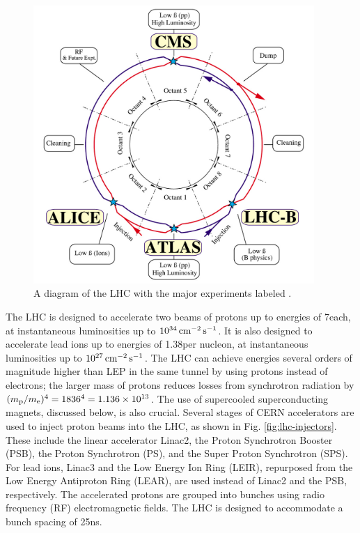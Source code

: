 \documentclass[12pt]{thesis}  %
\newcommand{\Pe}{\ensuremath{\cmsSymbolFace{e}}\xspace}
\newcommand{\Pp}{\ensuremath{\cmsSymbolFace{p}}\xspace}
\begin{document}
\begin{figure}[hbt]
\begin{center}
\includegraphics[width=0.95\textwidth]{figures/lhc-pho-1997-060.png}
\caption{A diagram of the LHC with the major experiments labeled \cite{Jean-Luc:841573}.}
\label{fig:lhc-diagram}
\end{center}
\end{figure}

The LHC is designed to accelerate two beams of protons up to energies of 7\TeV each, at instantaneous luminosities up to $10^{34}\,\text{cm}^\text{$-$2}\,\text{s}^\text{$-$1}$. It is also designed to accelerate lead ions up to energies of 1.38\TeV per nucleon, at instantaneous luminosities up to $10^{27}\,\text{cm}^\text{$-$2}\,\text{s}^\text{$-$1}$. The LHC can achieve energies several orders of magnitude higher than LEP in the same tunnel by using protons instead of electrons; the larger mass of protons reduces losses from synchrotron radiation by $(m_{\Pp}/m_{\Pe})^{4} = 1836^{4} = 1.136\times10^{13}$. The use of supercooled superconducting magnets, discussed below, is also crucial. Several stages of CERN accelerators are used to inject proton beams into the LHC, as shown in Fig. \ref{fig:lhc-injectors}. These include the linear accelerator Linac2, the Proton Synchrotron Booster (PSB), the Proton Synchrotron (PS), and the Super Proton Synchrotron (SPS). For lead ions, Linac3 and the Low Energy Ion Ring (LEIR), repurposed from the Low Energy Antiproton Ring (LEAR), are used instead of Linac2 and the PSB, respectively. The accelerated protons are grouped into bunches using radio frequency (RF) electromagnetic fields. The LHC is designed to accommodate a bunch spacing of 25\unit{ns}.
\end{document}
